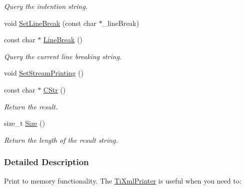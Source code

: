 \begin{DoxyCompactItemize}
\begin{DoxyCompactList}\small\item\em Query the indention string. \item\end{DoxyCompactList}\item 
void \hyperlink{class_ti_xml_printer_a4be1e37e69e3858c59635aa947174fe6}{SetLineBreak} (const char $\ast$\_\-lineBreak)
\item 
\hypertarget{class_ti_xml_printer_a11f1b4804a460b175ec244eb5724d96d}{
const char $\ast$ \hyperlink{class_ti_xml_printer_a11f1b4804a460b175ec244eb5724d96d}{LineBreak} ()}
\label{class_ti_xml_printer_a11f1b4804a460b175ec244eb5724d96d}

\begin{DoxyCompactList}\small\item\em Query the current line breaking string. \item\end{DoxyCompactList}\item 
void \hyperlink{class_ti_xml_printer_ab23a90629e374cb1cadca090468bbd19}{SetStreamPrinting} ()
\item 
\hypertarget{class_ti_xml_printer_a859eede9597d3e0355b77757be48735e}{
const char $\ast$ \hyperlink{class_ti_xml_printer_a859eede9597d3e0355b77757be48735e}{CStr} ()}
\label{class_ti_xml_printer_a859eede9597d3e0355b77757be48735e}

\begin{DoxyCompactList}\small\item\em Return the result. \item\end{DoxyCompactList}\item 
\hypertarget{class_ti_xml_printer_ad01375ae9199bd2f48252eaddce3039d}{
size\_\-t \hyperlink{class_ti_xml_printer_ad01375ae9199bd2f48252eaddce3039d}{Size} ()}
\label{class_ti_xml_printer_ad01375ae9199bd2f48252eaddce3039d}

\begin{DoxyCompactList}\small\item\em Return the length of the result string. \item\end{DoxyCompactList}\end{DoxyCompactItemize}


\subsubsection{Detailed Description}
Print to memory functionality. The \hyperlink{class_ti_xml_printer}{TiXmlPrinter} is useful when you need to:


